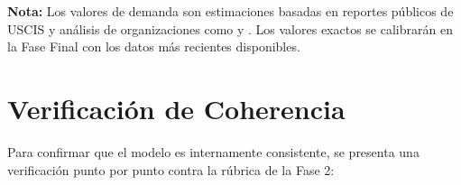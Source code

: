 \documentclass[12pt,letterpaper]{article}
\begin{document}
\begin{table}[H]
\centering
\caption{Muestra de datos reales para los 21 bloques de países (categoría EB-2).}
\label{tab:datos_reales}
\renewcommand{\arraystretch}{1.3}
\end{table}

\begin{yellowbox}
\textbf{Nota:} Los valores de demanda son estimaciones basadas en reportes públicos de USCIS y análisis de organizaciones como \textcite{kodem2024} y \textcite{boundless2024}. Los valores exactos se calibrarán en la Fase Final con los datos más recientes disponibles.
\end{yellowbox}

\newpage
\section{Verificación de Coherencia}

Para confirmar que el modelo es internamente consistente, se presenta una verificación punto por punto contra la rúbrica de la Fase 2:
\end{document}
